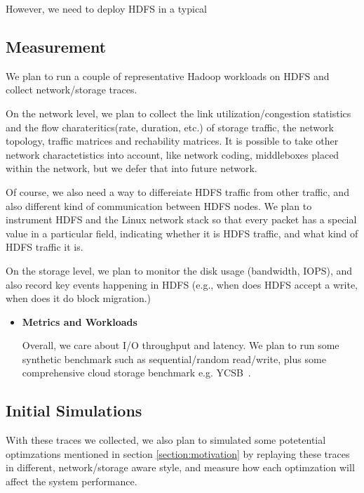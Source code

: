 However, we need to deploy HDFS in a typical 

\subsection {\bf Measurement}
We plan to run a couple of representative Hadoop workloads on HDFS and collect network/storage traces.

On the network level, we plan to collect the link utilization/congestion statistics and the flow charateritics(rate, duration, etc.) of storage traffic, the network topology, traffic matrices and rechability matrices. It is possible to take other network charactetistics into account, like network coding, middleboxes placed within the network, but we defer that into future network. 

Of course, we also need a way to differeiate HDFS traffic from other traffic, and also different kind of communication between HDFS nodes. We plan to instrument HDFS and the Linux network stack so that every packet has a special value in a particular field, indicating whether it is HDFS traffic, and what kind of HDFS traffic it is.

On the storage level, we plan to monitor the disk usage (bandwidth, IOPS), and also record key events happening in HDFS (e.g., when does HDFS accept a write, when does it do block migration.) 


\begin{itemize}
	\item {\bf Metrics and Workloads}

Overall, we care about I/O throughput and latency. We plan to run some synthetic benchmark such as sequential/random read/write, plus some comprehensive cloud storage benchmark e.g. YCSB~\cite{YCSB}.

	

\end{itemize}

\subsection{\bf Initial Simulations}
With these traces we collected, we also plan to simulated some potetential optimzations mentioned in section \ref{section:motivation} by replaying these traces in different, network/storage aware style, and measure how each optimzation will affect the system performance.


